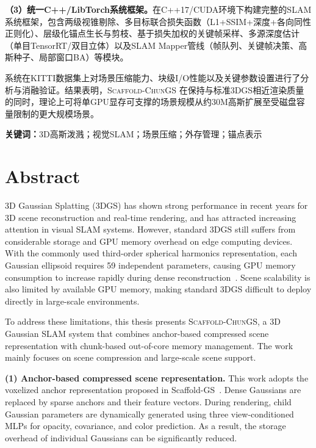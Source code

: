 \documentclass[zihao=-4,twoside,openright,fontset=none]{ctexbook}
\numberwithin{figure}{chapter}
\numberwithin{table}{chapter}
\numberwithin{equation}{chapter}
\newcommand{\ScaffoldChunGS}{\textsc{Scaffold-ChunGS}\xspace}
\begin{document}
\textbf{（3）统一C++/LibTorch系统框架。}在C++17/CUDA环境下构建完整的SLAM系统框架，包含两级视锥剔除、多目标联合损失函数（L1+SSIM+深度+各向同性正则化）、层级化锚点生长与剪枝、基于损失加权的关键帧采样、多源深度估计（单目TensorRT/双目立体）以及SLAM Mapper管线（帧队列、关键帧决策、高斯种子、局部窗口BA）等模块。

系统在KITTI数据集\cite{Geiger2012CVPR}上对场景压缩能力、块级I/O性能以及关键参数设置进行了分析与消融验证。结果表明，\ScaffoldChunGS 在保持与标准3DGS相近渲染质量的同时，理论上可将单GPU显存可支撑的场景规模从约30M高斯扩展至受磁盘容量限制的更大规模场景。

\vspace{1em}
\noindent\textbf{关键词：}3D高斯泼溅；视觉SLAM；场景压缩；外存管理；锚点表示

\chapter*{\bfseries Abstract}

3D Gaussian Splatting (3DGS) has shown strong performance in recent years for 3D scene reconstruction and real-time rendering, and has attracted increasing attention in visual SLAM systems. However, standard 3DGS still suffers from considerable storage and GPU memory overhead on edge computing devices. With the commonly used third-order spherical harmonics representation, each Gaussian ellipsoid requires 59 independent parameters, causing GPU memory consumption to increase rapidly during dense reconstruction~\cite{kerbl20233dgaussians}. Scene scalability is also limited by available GPU memory, making standard 3DGS difficult to deploy directly in large-scale environments.

To address these limitations, this thesis presents \ScaffoldChunGS, a 3D Gaussian SLAM system that combines anchor-based compressed scene representation with chunk-based out-of-core memory management. The work mainly focuses on scene compression and large-scale scene support.

\textbf{(1) Anchor-based compressed scene representation.}
This work adopts the voxelized anchor representation proposed in Scaffold-GS~\cite{lu2024scaffoldgs}. Dense Gaussians are replaced by sparse anchors and their feature vectors. During rendering, child Gaussian parameters are dynamically generated using three view-conditioned MLPs for opacity, covariance, and color prediction. As a result, the storage overhead of individual Gaussians can be significantly reduced.
\end{document}
